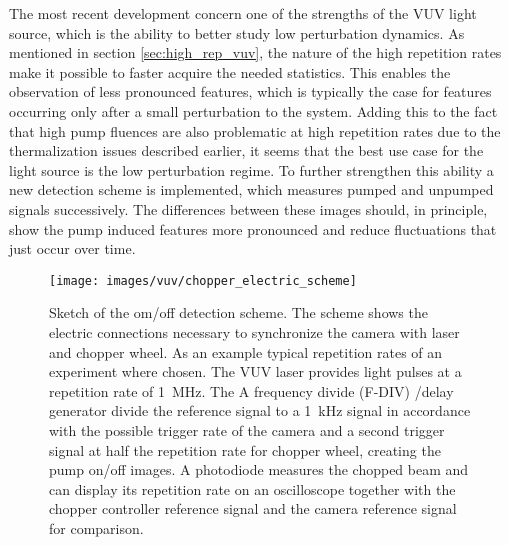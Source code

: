 The most recent development concern one of the strengths of the VUV light source, which is the ability to better study low perturbation dynamics.
As mentioned in section \ref{sec:high_rep_vuv}, the nature of the high repetition rates make it possible to faster acquire the needed statistics.
This enables the observation of less pronounced features, which is typically the case for features occurring only after a small perturbation to the system.
Adding this to the fact that high pump fluences are also problematic at high repetition rates due to the thermalization issues described earlier, it seems that the best use case for the light source is the low perturbation regime.
To further strengthen this ability a new detection scheme is implemented, which measures pumped and unpumped signals successively.
The differences between these images should, in principle, show the pump induced features more pronounced and reduce fluctuations that just occur over time.

\begin{figure}
	\centering
	\texttt{[image: images/vuv/chopper\_electric\_scheme]}
	\caption{Sketch of the om/off detection scheme. The scheme shows the electric connections necessary to synchronize the camera with laser and chopper wheel. As an example typical repetition rates of an experiment where chosen. The VUV laser provides light pulses at a repetition rate of \qty{1}{\mega\hertz}. The A frequency divide (F-DIV) /delay generator divide the reference signal to a \qty{1}{\kilo\hertz} signal in  accordance with the possible trigger rate of the camera and a second trigger signal at half the repetition rate for chopper wheel, creating the pump on/off images. A photodiode measures the chopped beam and can display its repetition rate on an oscilloscope together with the chopper controller reference signal and the camera reference signal for comparison.}
	\label{fig:triggerscheme}
\end{figure}

